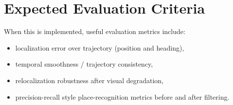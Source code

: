 \documentclass[11pt]{article}
\begin{document}
\section*{Expected Evaluation Criteria}
When this is implemented, useful evaluation metrics include:
\begin{itemize}[leftmargin=*]
  \item localization error over trajectory (position and heading),
  \item temporal smoothness / trajectory consistency,
  \item relocalization robustness after visual degradation,
  \item precision-recall style place-recognition metrics before and after filtering.
\end{itemize}
\end{document}
